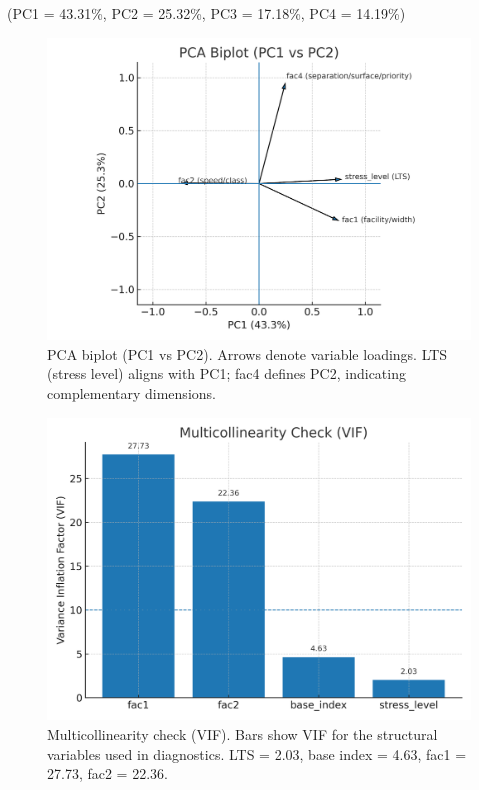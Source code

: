 \documentclass[
  12pt,
  oneside]{book}
\begin{document}
(PC1 = 43.31\%, PC2 = 25.32\%, PC3 = 17.18\%, PC4 = 14.19\%)

\begin{figure}

{\centering \includegraphics[width=0.9\linewidth]{general_images/pca} 

}

\caption{PCA biplot (PC1 vs PC2). Arrows denote variable loadings. LTS (stress level) aligns with PC1; fac4 defines PC2, indicating complementary dimensions.}\label{fig:pca}
\end{figure}

\begin{figure}

{\centering \includegraphics[width=0.75\linewidth]{general_images/vif1} 

}

\caption{Multicollinearity check (VIF). Bars show VIF for the structural variables used in diagnostics. LTS = 2.03, base index = 4.63, fac1 = 27.73, fac2 = 22.36.}\label{fig:vif1}
\end{figure}
\end{document}
